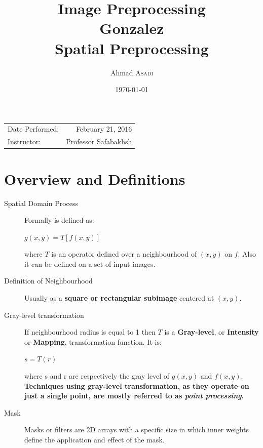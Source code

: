 \documentclass{article}
\title{Image Preprocessing\\Gonzalez\\Spatial Preprocessing} %
\author{Ahmad \textsc{Asadi}} %
\date{\today} %
\begin{document}
\maketitle %

\begin{center}
\begin{tabular}{l r}
Date Performed: & February 21, 2016 \\ %
Instructor: & Professor Safabakhsh %
\end{tabular}
\end{center}



\section{Overview and Definitions}
\begin{description}
\item [Spatial Domain Process] Formally is defined as:\\
	\begin{center}$g(x,y) = T[f(x,y)]$\end{center}
	where $T$ is an operator defined over a neighbourhood of $(x,y)$ on $f$. Also it can be defined on a set of input images.
\item [Definition of Neighbourhood] 
	Usually as a \textbf{square or rectangular subimage} centered at $(x,y)$.
\item [Gray-level transformation] If neighbourhood radius is equal to 1 then $T$ is a \textbf{Gray-level}, or \textbf{Intensity} or \textbf{Mapping}, transformation function.
It is:\\
	\begin{center}$ s = T(r) $\end{center}
	where s and r are respectively the gray level of $g(x,y)$ and $f(x,y)$.\\
	\textbf{Techniques using gray-level transformation, as they operate on just a single point, are mostly referred to as \textit{point processing}.}
\item [Mask] Masks or filters are 2D arrays with a specific size in which inner weights define the application and effect of the mask.
\end{description}
\end{document}
